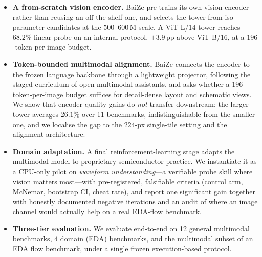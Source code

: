 \begin{itemize}
\item \textbf{A from-scratch vision encoder.}
BaiZe pre-trains its own vision encoder rather than reusing an off-the-shelf one, and selects the tower from iso-parameter candidates at the $500$--$600$\,M scale.
A ViT-L/14 tower reaches $68.2\%$ linear-probe on an internal protocol, $+3.9$\,pp above ViT-B/16, at a $196$-token-per-image budget.

\item \textbf{Token-bounded multimodal alignment.}
BaiZe connects the encoder to the frozen language backbone through a lightweight projector, following the staged curriculum of open multimodal assistants, and asks whether a $196$-token-per-image budget suffices for detail-dense layout and schematic views.
We show that encoder-quality gains do \emph{not} transfer downstream: the larger tower averages $26.1\%$ over 11 benchmarks, indistinguishable from the smaller one, and we localise the gap to the $224$-px single-tile setting and the alignment architecture.

\item \textbf{Domain adaptation.}
A final reinforcement-learning stage adapts the multimodal model to proprietary semiconductor practice. We instantiate it as a CPU-only pilot on \emph{waveform understanding}---a verifiable probe skill where vision matters most---with pre-registered, falsifiable criteria (control arm, McNemar, bootstrap CI, cheat rate), and report one significant gain together with honestly documented negative iterations and an audit of where an image channel would actually help on a real EDA-flow benchmark.

\item \textbf{Three-tier evaluation.}
We evaluate end-to-end on 12 general multimodal benchmarks, 4 domain (EDA) benchmarks, and the multimodal subset of an EDA flow benchmark, under a single frozen execution-based protocol.
\end{itemize}
